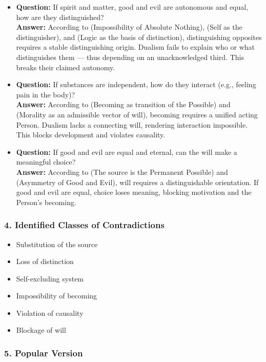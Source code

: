 \documentclass[12pt]{article}
\begin{document}
\begin{itemize}
\item \textbf{Question:} If spirit and matter, good and evil are autonomous and equal, how are they distinguished?  
\\ \textbf{Answer:} According to \text{[1]} (Impossibility of Absolute Nothing), \text{[10.5]} (Self as the distinguisher), and \text{[11.1]} (Logic as the basis of distinction), distinguishing opposites requires a stable distinguishing origin. Dualism fails to explain who or what distinguishes them — thus depending on an unacknowledged third. This breaks their claimed autonomy.

\item \textbf{Question:} If substances are independent, how do they interact (e.g., feeling pain in the body)?  
\\ \textbf{Answer:} According to \text{[7]} (Becoming as transition of the Possible) and \text{[11.4]} (Morality as an admissible vector of will), becoming requires a unified acting Person. Dualism lacks a connecting will, rendering interaction impossible. This blocks development and violates causality.

\item \textbf{Question:} If good and evil are equal and eternal, can the will make a meaningful choice?  
\\ \textbf{Answer:} According to \text{[6]} (The source is the Permanent Possible) and \text{[11.3.3]} (Asymmetry of Good and Evil), will requires a distinguishable orientation. If good and evil are equal, choice loses meaning, blocking motivation and the Person’s becoming.
\end{itemize}

\subsubsection*{4. Identified Classes of Contradictions}

\begin{itemize}
\item Substitution of the source
\item Loss of distinction
\item Self-excluding system
\item Impossibility of becoming
\item Violation of causality
\item Blockage of will
\end{itemize}

\subsubsection*{5. Popular Version}
\end{document}
